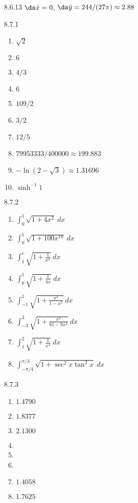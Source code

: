 \begin{Answer}{8.6.13}
$\ds \bar x=0$, $\ds\bar y=244/(27\pi)\approx 2.88$
\end{Answer}
\begin{Answer}{8.7.1}
\begin{enumerate}
\item {$\sqrt{2}$}
\item {$6$}
\item {$4/3$}
\item {$6$}
\item {$109/2$}
\item {$3/2$}
\item {$12/5$}
\item {$79953333/400000 \approx 199.883$}
\item {$-\ln (2-\sqrt{3}) \approx 1.31696$}
\item {$\sinh^{-1} 1$}
\end{enumerate}
\end{Answer}
\begin{Answer}{8.7.2}
\begin{enumerate}
\item {$\int_0^1 \sqrt{1+4x^2}\ dx$}
\item {$\int_0^1 \sqrt{1+100x^{18}}\ dx$}
\item {$\int_1^e \sqrt{1+\frac1{x^2}}\ dx$}
\item {$\int_0^1 \sqrt{1+\frac{1}{4x}}\ dx$}
\item {$\int_{-1}^1 \sqrt{1+\frac{x^2}{1-x^2}}\ dx$}
\item
{$\int_{-3}^3 \sqrt{1+\frac{x^2}{81-9x^2}}\ dx$}

\item {$\int_{1}^2 \sqrt{1+\frac1{x^4}}\ dx$}
\item {$\int_{-\pi/4}^{\pi/4} \sqrt{1+\sec^2x\tan^2x}\ dx$}

\end{enumerate}
\end{Answer}
\begin{Answer}{8.7.3}
\begin{enumerate}
\item {$1.4790$}
\item {$1.8377$}
\item {$2.1300$}
\item
\item
\item
\item {$1.4058$}
\item {$1.7625$}
\end{enumerate}
\end{Answer}
